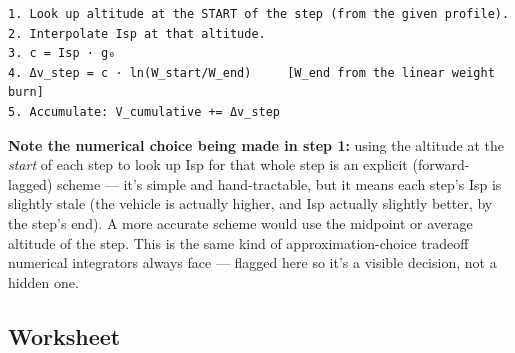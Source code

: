 \documentclass[
  10pt,
]{article}
\begin{document}
\begin{verbatim}
1. Look up altitude at the START of the step (from the given profile).
2. Interpolate Isp at that altitude.
3. c = Isp · g₀
4. Δv_step = c · ln(W_start/W_end)     [W_end from the linear weight burn]
5. Accumulate: V_cumulative += Δv_step
\end{verbatim}

\textbf{Note the numerical choice being made in step 1:} using the
altitude at the \emph{start} of each step to look up Isp for that whole
step is an explicit (forward-lagged) scheme --- it's simple and
hand-tractable, but it means each step's Isp is slightly stale (the
vehicle is actually higher, and Isp actually slightly better, by the
step's end). A more accurate scheme would use the midpoint or average
altitude of the step. This is the same kind of approximation-choice
tradeoff numerical integrators always face --- flagged here so it's a
visible decision, not a hidden one.

\hypertarget{worksheet}{%
\subsection{Worksheet}\label{worksheet}}
\end{document}
